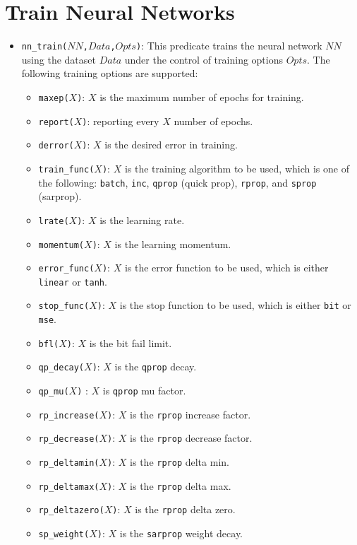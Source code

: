 \section{Train Neural Networks}
\begin{itemize}
\item \texttt{nn\_train($NN$,$Data$,$Opts$)}: This predicate trains the neural network $NN$ using the dataset $Data$ under the control of training options $Opts$. The following training options are supported:
\begin{itemize}
\item \texttt{maxep($X$)}: $X$ is the maximum number of epochs for training.
\item \texttt{report($X$)}:	reporting every $X$ number of epochs. 
\item \texttt{derror($X$)}:	$X$ is the desired error in training.
\item \texttt{train\_func($X$)}: $X$ is the training algorithm to be used, which is one of the following: \texttt{batch}, \texttt{inc}, \texttt{qprop} (quick prop), \texttt{rprop}, and \texttt{sprop} (sarprop).
\item \texttt{lrate($X$)}: $X$ is the learning rate.
\item \texttt{momentum($X$)}: $X$ is the learning momentum.
\item \texttt{error\_func($X$)}: $X$ is the error function to be used, which is either \texttt{linear} or \texttt{tanh}.
\item \texttt{stop\_func($X$)}:	$X$ is the stop function to be used, which is either \texttt{bit} or \texttt{mse}.
\item \texttt{bfl($X$)}:  $X$ is the bit fail limit.
\item \texttt{qp\_decay($X$)}:	 $X$ is the \texttt{qprop} decay.
\item \texttt{qp\_mu($X$)} : $X$ is \texttt{qprop}  mu factor.
\item \texttt{rp\_increase($X$)}:	$X$ is the \texttt{rprop} increase factor.
\item \texttt{rp\_decrease($X$)}: $X$ is the \texttt{rprop} decrease factor.
\item \texttt{rp\_deltamin($X$)}: $X$ is the \texttt{rprop} delta min.
\item \texttt{rp\_deltamax($X$)}: $X$ is the \texttt{rprop} delta max.
\item \texttt{rp\_deltazero($X$)}: $X$ is the \texttt{rprop} delta zero.
\item \texttt{sp\_weight($X$)}:	$X$ is the \texttt{sarprop} weight decay.

\end{itemize}
\end{itemize}
